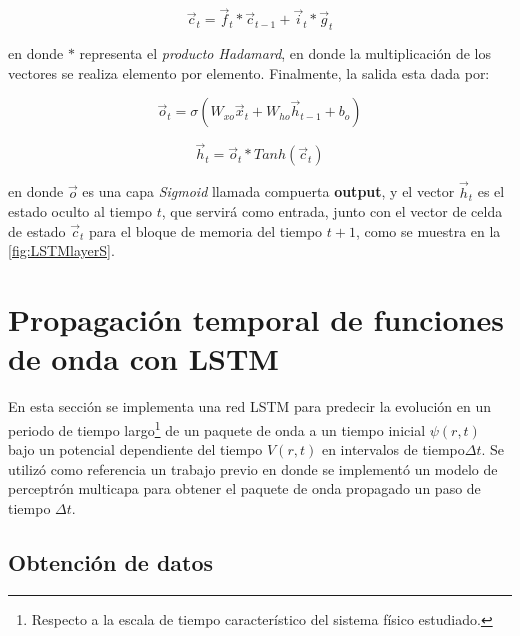 \begin{equation}\label{eq:ct}
\vec{c}_t = \vec{f}_t \ast \vec{c}_{t-1} + \vec{i}_t \ast \vec{g}_t
\end{equation}

en donde $\ast$ representa el \emph{producto Hadamard}, en donde la multiplicación de los vectores se realiza elemento por elemento. Finalmente, la salida esta dada por:

\begin{equation}\label{eq:ot}
\vec{o}_t = \sigma(W_{xo}\vec{x}_t + W_{ho}\vec{h}_{t-1} + b_o)
\end{equation}

\begin{equation}\label{eq:ht}
\vec{h}_t = \vec{o}_t\ast Tanh(\vec{c}_t)
\end{equation}

en donde $\vec{o}$ es una capa \emph{Sigmoid} llamada compuerta \textbf{output}, y el vector $\vec{h}_t$ es el estado oculto al tiempo $t$, que servirá como entrada, junto con el vector de celda de estado $\vec{c}_t$ para el bloque de memoria del tiempo $t+1$, como se muestra en la \autoref{fig:LSTMlayerS}.


\section{Propagación temporal de funciones de onda con LSTM}\label{sec:Project}

En esta sección se implementa una red \acs{LSTM} para predecir la evolución en un periodo de tiempo largo\footnote{Respecto a la escala de tiempo característico del sistema físico estudiado.} de un paquete de onda a un tiempo inicial $\psi(r,t)$ bajo un potencial dependiente del tiempo $V(r,t)$ en intervalos de tiempo$\Delta t$. Se utilizó como referencia un trabajo previo \cite{Main:2021} en donde se implementó un modelo de perceptrón multicapa para obtener el paquete de onda propagado un paso de tiempo $\Delta t$.

\subsection{Obtención de datos}

